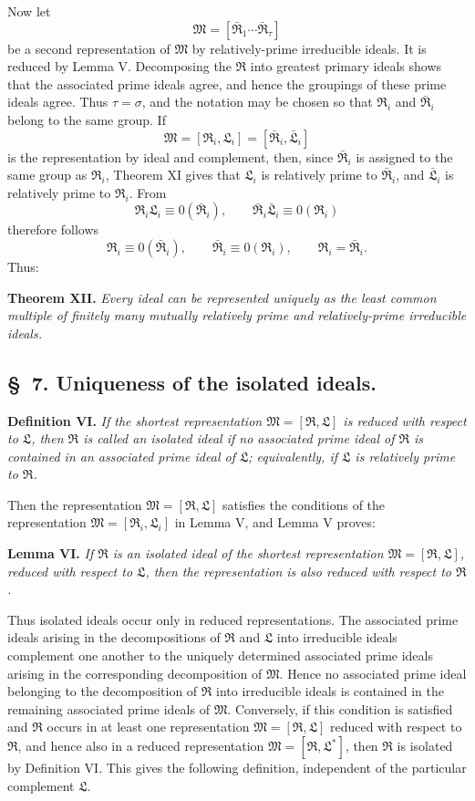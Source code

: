 \documentclass[11pt]{article}
\newcommand{\ideal}[1]{\mathfrak{#1}}
\begin{document}
Now let
\[
 \ideal M=[\bar{\ideal R}_1\cdots\bar{\ideal R}_\tau]
\]
be a second representation of $\ideal M$ by relatively-prime irreducible ideals. It is reduced by Lemma V. Decomposing the $\ideal R$ into greatest primary ideals shows that the associated prime ideals agree, and hence the groupings of these prime ideals agree. Thus $\tau=\sigma$, and the notation may be chosen so that $\ideal R_i$ and $\bar{\ideal R}_i$ belong to the same group. If
\[
 \ideal M=[\ideal R_i,
\ideal L_i]=[\bar{\ideal R}_i,
\bar{\ideal L}_i]
\]
is the representation by ideal and complement, then, since $\bar{\ideal R}_i$ is assigned to the same group as $\ideal R_i$, Theorem XI gives that $\ideal L_i$ is relatively prime to $\bar{\ideal R}_i$, and $\bar{\ideal L}_i$ is relatively prime to $\ideal R_i$. From
\[
 \ideal R_i\ideal L_i\equiv0(\bar{\ideal R}_i),
 \qquad
 \bar{\ideal R}_i\bar{\ideal L}_i\equiv0(\ideal R_i)
\]
therefore follows
\[
 \ideal R_i\equiv0(\bar{\ideal R}_i),
 \qquad
 \bar{\ideal R}_i\equiv0(\ideal R_i),
 \qquad
 \ideal R_i=\bar{\ideal R}_i.
\]
Thus:

\textbf{Theorem XII.} \emph{Every ideal can be represented uniquely as the least common multiple of finitely many mutually relatively prime and relatively-prime irreducible ideals.}

\subsection*{\S~7. Uniqueness of the isolated ideals.}

\textbf{Definition VI.} \emph{If the shortest representation $\ideal M=[\ideal R,
\ideal L]$ is reduced with respect to $\ideal L$, then $\ideal R$ is called an isolated ideal if no associated prime ideal of $\ideal R$ is contained in an associated prime ideal of $\ideal L$; equivalently, if $\ideal L$ is relatively prime to $\ideal R$.}

Then the representation $\ideal M=[\ideal R,
\ideal L]$ satisfies the conditions of the representation $\ideal M=[\ideal R_i,
\ideal L_i]$ in Lemma V, and Lemma V proves:

\textbf{Lemma VI.} \emph{If $\ideal R$ is an isolated ideal of the shortest representation $\ideal M=[\ideal R,
\ideal L]$, reduced with respect to $\ideal L$, then the representation is also reduced with respect to $\ideal R$.}

Thus isolated ideals occur only in reduced representations. The associated prime ideals arising in the decompositions of $\ideal R$ and $\ideal L$ into irreducible ideals complement one another to the uniquely determined associated prime ideals arising in the corresponding decomposition of $\ideal M$. Hence no associated prime ideal belonging to the decomposition of $\ideal R$ into irreducible ideals is contained in the remaining associated prime ideals of $\ideal M$. Conversely, if this condition is satisfied and $\ideal R$ occurs in at least one representation $\ideal M=[\ideal R,
\ideal L]$ reduced with respect to $\ideal R$, and hence also in a reduced representation $\ideal M=[\ideal R,
\ideal L^*]$, then $\ideal R$ is isolated by Definition VI. This gives the following definition, independent of the particular complement $\ideal L$.
\end{document}
